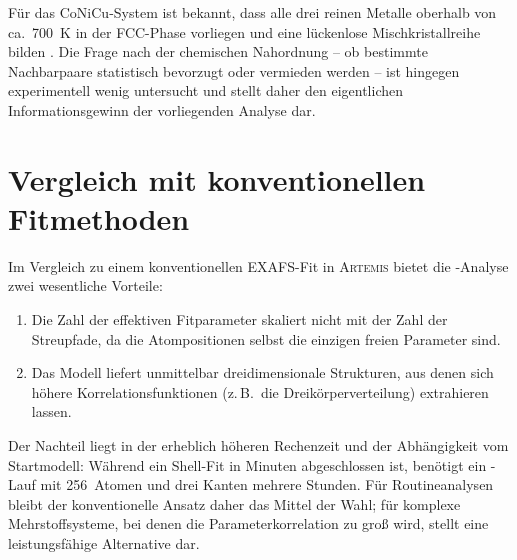 Für das CoNiCu-System ist bekannt, dass alle drei reinen Metalle
oberhalb von ca.\ \SI{700}{\kelvin} in der FCC-Phase vorliegen und
eine lückenlose Mischkristallreihe bilden \cite{George2019}.
Die Frage nach der chemischen Nahordnung -- ob bestimmte
Nachbarpaare statistisch bevorzugt oder vermieden werden -- ist
hingegen experimentell wenig untersucht und stellt daher den
eigentlichen Informationsgewinn der vorliegenden Analyse dar.

\section{Vergleich mit konventionellen Fitmethoden}

Im Vergleich zu einem konventionellen EXAFS-Fit in \textsc{Artemis}
bietet die \evax{}-Analyse zwei wesentliche Vorteile:
\begin{enumerate}[nosep]
  \item Die Zahl der effektiven Fitparameter skaliert nicht mit der
        Zahl der Streupfade, da die Atompositionen selbst die einzigen
        freien Parameter sind.
  \item Das Modell liefert unmittelbar dreidimensionale Strukturen,
        aus denen sich höhere Korrelationsfunktionen (z.\,B.\ die
        Dreikörperverteilung) extrahieren lassen.
\end{enumerate}

Der Nachteil liegt in der erheblich höheren Rechenzeit und der
Abhängigkeit vom Startmodell: Während ein Shell-Fit in Minuten
abgeschlossen ist, benötigt ein \evax{}-Lauf mit 256~Atomen und
drei Kanten mehrere Stunden.
Für Routineanalysen bleibt der konventionelle Ansatz daher das Mittel
der Wahl; für komplexe Mehrstoffsysteme, bei denen die
Parameterkorrelation zu groß wird, stellt \evax{} eine leistungsfähige
Alternative dar.
